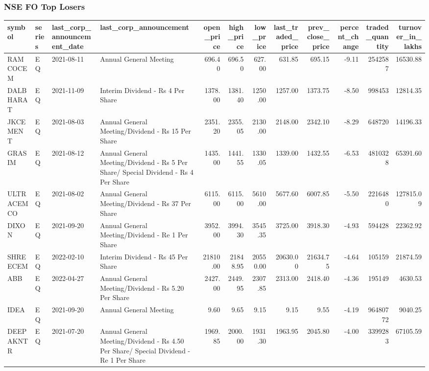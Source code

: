 \documentclass[
]{article}
\begin{document}
\hypertarget{nse-fo-top-losers}{%
\subsubsection{\texorpdfstring{ NSE FO Top
Losers}{ NSE FO Top Losers}}\label{nse-fo-top-losers}}

\begin{table}
\centering\begingroup\fontsize{12}{14}\selectfont

\begin{tabular}{l|l|l|l|r|r|r|r|r|r|r|r}
\hline
symbol & series & last\_corp\_announcement\_date & last\_corp\_announcement & open\_price & high\_price & low\_price & last\_traded\_price & prev\_close\_price & percent\_change & traded\_quantity & turnover\_in\_lakhs\\
\hline
RAMCOCEM & EQ & 2021-08-11 & Annual General Meeting & 696.40 & 696.50 & 627.00 & 631.85 & 695.15 & -9.11 & 2542587 & 16530.88\\
\hline
DALBHARAT & EQ & 2021-11-09 & Interim Dividend - Rs 4 Per Share & 1378.00 & 1381.40 & 1250.00 & 1257.00 & 1373.75 & -8.50 & 998453 & 12814.35\\
\hline
JKCEMENT & EQ & 2021-08-03 & Annual General Meeting/Dividend - Rs 15 Per Share & 2351.20 & 2355.05 & 2130.00 & 2148.00 & 2342.10 & -8.29 & 648720 & 14196.33\\
\hline
GRASIM & EQ & 2021-08-12 & Annual General Meeting/Dividend - Rs 5  Per Share/ Special Dividend - Rs 4 Per Share & 1435.00 & 1441.55 & 1330.05 & 1339.00 & 1432.55 & -6.53 & 4810328 & 65391.60\\
\hline
ULTRACEMCO & EQ & 2021-08-02 & Annual General Meeting/Dividend - Rs 37 Per Share & 6115.00 & 6115.00 & 5610.00 & 5677.60 & 6007.85 & -5.50 & 2216480 & 127815.09\\
\hline
DIXON & EQ & 2021-09-20 & Annual General Meeting/Dividend - Re 1 Per Share & 3952.00 & 3994.30 & 3545.35 & 3725.00 & 3918.30 & -4.93 & 594428 & 22362.92\\
\hline
SHREECEM & EQ & 2022-02-10 & Interim Dividend - Rs 45 Per Share & 21810.00 & 21848.95 & 20550.00 & 20630.00 & 21634.75 & -4.64 & 105159 & 21874.59\\
\hline
ABB & EQ & 2022-04-27 & Annual General Meeting/Dividend - Rs 5.20 Per Share & 2427.00 & 2449.95 & 2307.85 & 2313.00 & 2418.40 & -4.36 & 195149 & 4630.53\\
\hline
IDEA & EQ & 2021-09-20 & Annual General Meeting & 9.60 & 9.65 & 9.15 & 9.15 & 9.55 & -4.19 & 96480772 & 9040.25\\
\hline
DEEPAKNTR & EQ & 2021-07-20 & Annual General Meeting/Dividend - Rs 4.50 Per Share/ Special Dividend - Re 1 Per Share & 1969.85 & 2000.00 & 1931.30 & 1963.95 & 2045.80 & -4.00 & 3399283 & 67105.59\\
\hline
\end{tabular}
\endgroup{}
\end{table}
\end{document}
